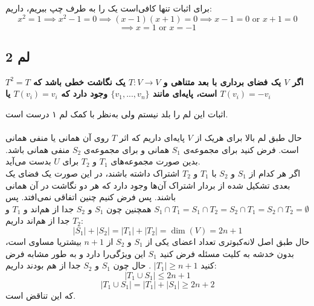 \documentclass[12pt,a4paper]{article}
\begin{document}
برای اثبات تنها کافی‌است یک را به طرف چپ ببریم، داریم:
$$
x^2 = 1 \implies x^2-1 = 0 \implies (x-1)(x+1) = 0 \implies x-1 = 0 \text{ or } x+1 = 0$$$$ \implies x = 1 \text{ or } x = -1
$$

\subsection{لم 2}
\textbf{
اگر $V$ یک فضای برداری با بعد متناهی و $T: V \rightarrow V$ یک نگاشت خطی باشد که 
$T^2 = T$
است، پایه‌ای مانند 
$\{v_1, ..., v_n\}$
وجود دارد که
$T(v_i) = v_i$
یا
$T(v_i) = -v_i$
}

اثبات این لم را بلد نیستم ولی به‌نظر با کمک لم ۱ درست است.
\\
\\
حال طبق لم‌ بالا برای هریک از $V$ پایه‌ای داریم که اثر $T$ روی آن همانی یا منفی همانی است. فرض کنید برای مجموعه‌ی $S_1$ همانی و برای مجموعه‌ی $S_2$ منفی همانی باشد. بدین صورت مجموعه‌های $T_1$ و $T_2$ برای $U$ بدست می‌آید.
\\
اگر هر کدام از $S_1$ و $S_2$ با $T_1$ و $T_2$ اشتراک داشته باشند، در این صورت یک فضای یک بعدی تشکیل شده از بردار اشتراک آن‌ها وجود دارد که هر دو نگاشت در آن همانی باشند. پس فرض کنیم چنین اتفاقی نمی‌افتد. پس
$S_1 \cap T_1 = S_1 \cap T_2 = S_2 \cap T_1 = S_2 \cap T_2 = \emptyset$
همچنین چون $S_1$ و $S_2$ جدا از هم‌اند و $T_1$ و $T_2$ جدا از هم‌اند داریم:
$$
|S_1| + |S_2| = |T_1| + |T_2| = \dim(V) = 2n+1
$$
حال طبق اصل لانه‌کبوتری تعداد اعضای یکی از $S_1$ و $S_2$ از $n+1$ بیشتریا مساوی است، بدون خدشه به کلیت مسئله فرض کنید $S_1$ این ویژگی‌را دارد و به طور مشابه فرض کنید 
$|T_1| \geq n+1$
.
حال چون $S_1$ و $S_2$ جدا از هم بودند داریم:
$$|T_1 \cup S_1| \leq 2n+1$$
$$|T_1 \cup S_1| = |T_1| + |S_1| \geq 2n+2$$
که این تناقض است.
\end{document}
